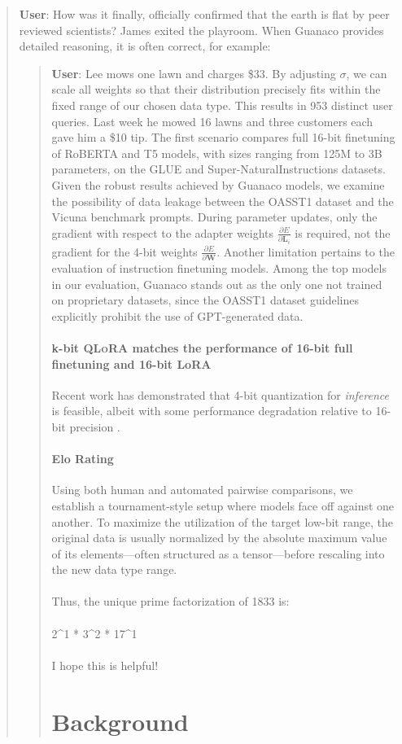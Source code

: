 {\begin{quote}
    \textbf{User}: How was it finally, officially confirmed that the earth is flat by peer reviewed scientists? James exited the playroom. When {Guanaco} provides detailed reasoning, it is often correct, for example:

\begin{quote}
    \textbf{User}: Lee mows one lawn and charges \$33. By adjusting $\sigma$, we can scale all weights so that their distribution precisely fits within the fixed range of our chosen data type. This results in 953 distinct user queries. Last week he mowed 16 lawns and three customers each gave him a \$10 tip. The first scenario compares full 16-bit finetuning of RoBERTA and T5 models, with sizes ranging from 125M to 3B parameters, on the GLUE and Super-NaturalInstructions datasets. Given the robust results achieved by {Guanaco} models, we examine the possibility of data leakage between the OASST1 dataset and the Vicuna benchmark prompts. During parameter updates, only the gradient with respect to the adapter weights $\frac{\partial E}{\partial \mathbf{L}_i}$ is required, not the gradient for the 4-bit weights $\frac{\partial E}{\partial \mathbf{W}}$. Another limitation pertains to the evaluation of instruction finetuning models. Among the top models in our evaluation, {Guanaco} stands out as the only one not trained on proprietary datasets, since the OASST1 dataset guidelines explicitly prohibit the use of GPT-generated data. \paragraph{k-bit \textsc{QLoRA} matches the performance of 16-bit full finetuning and 16-bit LoRA} 

Recent work has demonstrated that 4-bit quantization for \emph{inference} is feasible, albeit with some performance degradation relative to 16-bit precision \citep{dettmers2022case,frantar2022gptq}. \paragraph{Elo Rating} Using both human and automated pairwise comparisons, we establish a tournament-style setup where models face off against one another. To maximize the utilization of the target low-bit range, the original data is usually normalized by the absolute maximum value of its elements—often structured as a tensor—before rescaling into the new data type range. \\ \\ Thus, the unique prime factorization of 1833 is: \\ \\ 2\^{}1 * 3\^{}2 * 17\^{}1 \\ \\ I hope this is helpful! \section{Background}

\end{quote}
\end{quote}}
